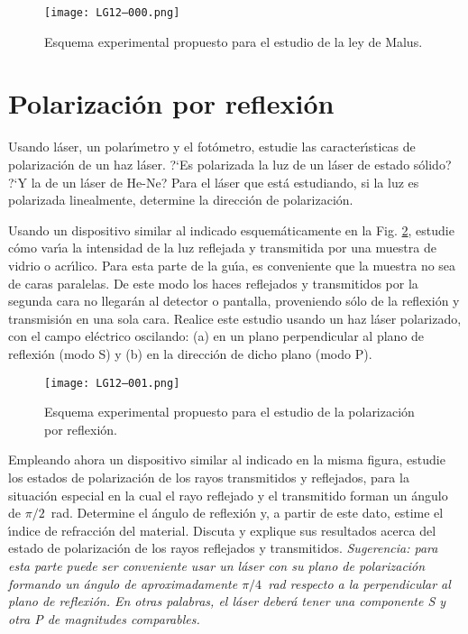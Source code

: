 \documentclass[laboratorio]{guia}
\begin{document}
\begin{figure}[t!]
    \centering
    \texttt{[image: LG12--000.png]}
    \caption{Esquema experimental propuesto para el estudio de la ley de Malus.}
    \label{fig:1}
\end{figure}

\section{Polarizaci\'on por reflexi\'on}

Usando l\'aser, un polar\'\i metro y el fot\'ometro, estudie las 
caracter\'\i sticas de polarizaci\'on de un haz l\'aser. ?`Es polarizada la
luz de un l\'aser de estado s\'olido? ?`Y la de un l\'aser de He-Ne? Para el
l\'aser que est\'a estudiando, si la luz es polarizada linealmente, determine
la direcci\'on de polarizaci\'on.

Usando un dispositivo similar al indicado esquem\'aticamente en la Fig. \ref{fig:2}, 
estudie c\'omo var\'\i a la intensidad de la luz reflejada y transmitida por 
una muestra de vidrio o acr\'\i lico. Para esta parte de la gu\'\i a, es 
conveniente que la muestra no sea de caras paralelas. De este modo los haces
reflejados y transmitidos por la segunda cara no llegar\'an al detector o
pantalla, proveniendo s\'olo de la reflexi\'on y transmisi\'on en una sola 
cara. Realice este estudio usando un haz l\'aser polarizado, con el campo
el\'ectrico oscilando: (a) en un plano perpendicular al plano de reflexi\'on 
(modo S) y (b) en la direcci\'on de dicho plano (modo P).

\begin{figure}[t!]
    \centering
    \texttt{[image: LG12--001.png]}
    \caption{Esquema experimental propuesto para el estudio de la polarizaci\'on
    por reflexi\'on.}
    \label{fig:2}
\end{figure}

Empleando ahora un dispositivo similar al indicado en la misma figura, estudie
los estados de polarizaci\'on de los rayos transmitidos y reflejados, para la
situaci\'on especial en la cual el rayo reflejado y el transmitido forman 
un \'angulo de $\pi/2$~rad. Determine el \'angulo de reflexi\'on y, a 
partir de este dato, estime el \'\i ndice de refracci\'on del material. 
Discuta y explique sus resultados acerca del estado de polarizaci\'on de los
rayos reflejados y transmitidos. {\it Sugerencia: para esta parte puede 
ser conveniente usar un l\'aser con su plano de polarizaci\'on formando un
\'angulo de aproximadamente $\pi/4$~rad respecto a la perpendicular al plano
de reflexi\'on. En otras palabras, el l\'aser deber\'a tener una componente
S y otra P de magnitudes comparables. }


\nocite{Alonso1998,Hecht1986,Jenkins2001}
 

\end{document}
